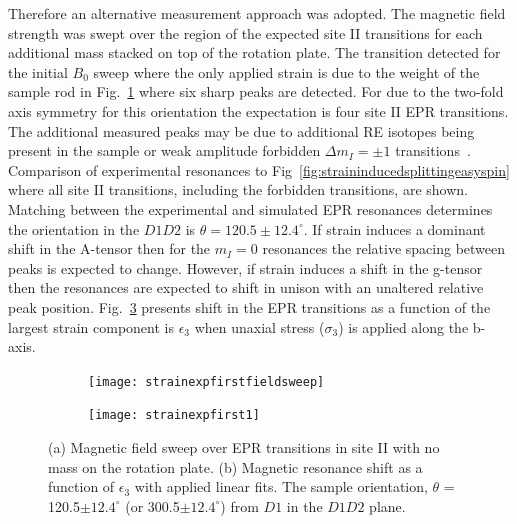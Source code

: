 Therefore an alternative measurement approach was adopted. The magnetic field strength was swept over the region of the expected site II transitions for each additional mass stacked on top of the rotation plate. The transition detected for the initial $B_{0}$ sweep where the only applied strain is due to the weight of the sample rod in Fig.~\ref{fig:strainexpfirstfieldsweep} where six sharp peaks are detected. For due to the two-fold axis symmetry for this orientation the expectation is four site II EPR transitions. The additional measured peaks may be due to additional RE isotopes being present in the sample or weak amplitude forbidden $\Delta m_{I} = \pm 1$ transitions~\citep{PhysRevB.97.064409}. Comparison of experimental resonances to Fig~\ref{fig:straininducedsplittingeasyspin} where all site II transitions, including the forbidden transitions, are shown. Matching between the experimental and simulated EPR resonances determines the orientation in the $D1D2$ is $\theta = 120.5\pm 12.4^{\circ}$. If strain induces a dominant shift in the A-tensor then for the $m_{I}=0$ resonances the relative spacing between peaks is expected to change. However, if strain induces a shift in the g-tensor then the resonances are expected to shift in unison with an unaltered relative peak position. Fig.~\ref{fig:strainexpfirst1} presents shift in the EPR transitions as a function of the largest strain component is $\epsilon_{3}$ when unaxial stress ($\sigma_{3}$) is applied along the b-axis.     

\begin{figure}[H]
    \centering
    \begin{subfigure}[b]{0.45\textwidth}
        \centering
        \texttt{[image: strainexpfirstfieldsweep]}
        \caption{\label{fig:strainexpfirstfieldsweep}}
    \end{subfigure}
    \begin{subfigure}[b]{0.45\textwidth}
        \centering
        \texttt{[image: strainexpfirst1]}
   \caption{\label{fig:strainexpfirst1}}
   \end{subfigure}
   \caption{(a) Magnetic field sweep over EPR transitions in site II with no mass on the rotation plate. (b) Magnetic resonance shift as a function of $\epsilon_{3}$ with applied linear fits. The sample orientation, $\theta$ = 120.5$\pm 12.4 ^{\circ}$ (or 300.5$\pm 12.4^{\circ}$) from $D1$ in the $D1D2$ plane.}
\end{figure}

